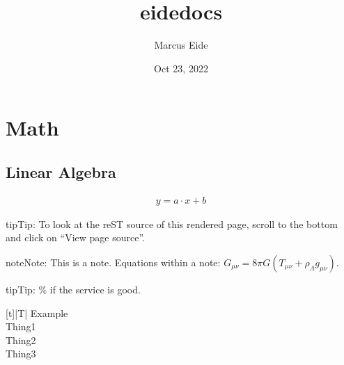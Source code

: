 \documentclass[letterpaper,10pt,english]{sphinxmanual}
\title{eidedocs}
\date{Oct 23, 2022}
\author{Marcus Eide}
\begin{document}
\pagestyle{empty}
\sphinxmaketitle
\pagestyle{plain}
\sphinxtableofcontents
\pagestyle{normal}
\label{\detokenize{index::doc}}


\sphinxstepscope


\chapter{Math}
\label{\detokenize{math/math:math}}\label{\detokenize{math/math::doc}}
\sphinxstepscope


\section{Linear Algebra}
\label{\detokenize{math/linear_algebra:linear-algebra}}\label{\detokenize{math/linear_algebra::doc}}\begin{equation*}
\begin{split}y = a \cdot x + b\end{split}
\end{equation*}
\begin{sphinxadmonition}{tip}{Tip:}
\sphinxAtStartPar
To look at the reST source of this rendered page, scroll to the bottom
and click on “View page source”.
\end{sphinxadmonition}

\begin{sphinxadmonition}{note}{Note:}
\sphinxAtStartPar
This is a note.
Equations within a note:
\(G_{\mu\nu} = 8 \pi G (T_{\mu\nu}  + \rho_\Lambda g_{\mu\nu})\).
\end{sphinxadmonition}

\begin{sphinxadmonition}{tip}{Tip:}
\% if the service is good.


\begin{savenotes}\sphinxattablestart
\centering
\begin{tabulary}{\linewidth}[t]{|T|}
\hline
\sphinxstyletheadfamily 
\sphinxAtStartPar
Example
\\
\hline
\sphinxAtStartPar
Thing1
\\
\hline
\sphinxAtStartPar
Thing2
\\
\hline
\sphinxAtStartPar
Thing3
\\
\hline
\end{tabulary}
\par
\sphinxattableend\end{savenotes}
\end{sphinxadmonition}
\end{document}
